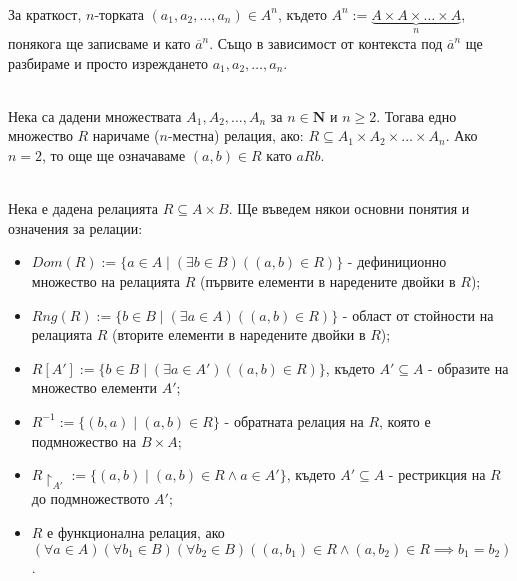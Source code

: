 \documentclass[12pt,twoside,a4paper]{article}
\begin{document}
	\newpage 
	\begin{denotation}[$n$-торка]~\\
		\indent За краткост, $n$-торката $(a_1, a_2, \dots, a_n) \in A^n$, където $A^n := \underbrace{A \times A \times \dots \times A}_n$, понякога ще записваме и като $\overline{a}^n$. Също в зависимост от контекста под $\overline{a}^n$ ще разбираме и просто изреждането $a_1, a_2, \dots, a_n$.
	\end{denotation}
	
	\begin{definition}[релация]~\\
		\indent Нека са дадени множествата $A_1, A_2, \dots, A_n$ за $n \in \mathbf{N}$ и $n \ge 2$. Тогава едно множество $R$ наричаме ($n$-местна) релация, ако: $R \subseteq A_1 \times A_2 \times \dots \times A_n$. Ако $n=2$, то още ще означаваме $(a,b) \in R$ като $aRb$.
	\end{definition}
	
	\begin{definitions}~\\
		\indent Нека е дадена релацията $R \subseteq A \times B$. Ще въведем някои основни понятия и означения за релации:
		\begin{itemize}
			\item $Dom(R) := \{a \in A \mid (\exists b \in B)((a,b) \in R)\}$ - дефиниционно множество на релацията $R$ (първите елементи в наредените двойки в $R$);
			\item $Rng(R) := \{b \in B \mid (\exists a \in A)((a,b) \in R)\}$ - област от стойности на релацията $R$ (вторите елементи в наредените двойки в $R$);
			\item $R[A'] := \{b \in B \mid (\exists a \in A')((a,b) \in R)\}$, където $A' \subseteq A$ - образите на множество елементи $A'$;
			\item $R^{-1} := \{(b, a) \mid (a,b) \in R\}$ - обратната релация на $R$, която е подмножество на $B \times A$;
			\item $R\restriction_{A'} := \{(a,b) \mid (a,b) \in R \land a \in A'\}$, където $A' \subseteq A$ - рестрикция на $R$ до подмножеството $A'$;
			\item $R$ е функционална релация, ако $(\forall a \in A)(\forall b_1 \in B)(\forall b_2 \in B)((a, b_1) \in R \land (a, b_2) \in R \implies b_1 = b_2)$.
		\end{itemize}
	\end{definitions}
	
\end{document}
